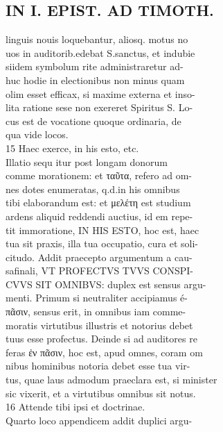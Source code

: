 \documentclass{article}
\begin{document}
\begin{pages}
\section*{IN I. EPIST. AD TIMOTH. \\
                }
linguis nouis loquebantur, aliosq. motus no \\
                uos in auditorib.edebat S.sanctus, et indubie \\
                siidem symbolum rite administraretur ad- \\
                huc hodie in electionibus non minus quam \\
                olim esset efficax, si maxime externa et inso- \\
                lita ratione sese non exereret Spiritus S. Lo- \\
                cus est de vocatione quoque ordinaria, de \\
                qua vide locos. \\
                15 Haec exerce, in his esto, etc. \\
                Illatio sequ itur post longam donorum \\
                comme morationem: et ταῦτα, refero ad om- \\
                nes dotes enumeratas, q.d.in his omnibus \\
                tibi elaborandum est: et μελέτη est studium \\
                ardens aliquid reddendi auctius, id em repe- \\
                tit immoratione, IN HIS ESTO, hoc est, haec \\
                tua sit praxis, illa tua occupatio, cura et soli- \\
                citudo. Addit praecepto argumentum a cau- \\
                safinali, VT PROFECTVS TVVS CONSPI- \\
                CVVS SIT OMNIBVS: duplex est sensus argu- \\
                menti. Primum si neutraliter accipiamus é- \\
                πᾶσιν, sensus erit, in omnibus iam comme- \\
                moratis virtutibus illustris et notorius debet \\
                tuus esse profectus. Deinde si ad auditores re \\
                feras ἐν πᾶσιν, hoc est, apud omnes, coram om \\
                nibus hominibus notoria debet esse tua vir- \\
                tus, quae laus admodum praeclara est, si minister \\
                sic vixerit, et a virtutibus omnibus sit notus. \\
                16 Attende tibi ipsi et doctrinae. \\
                Quarto loco appendicem addit duplici argu- \\
                

\end{pages}
\end{document}
